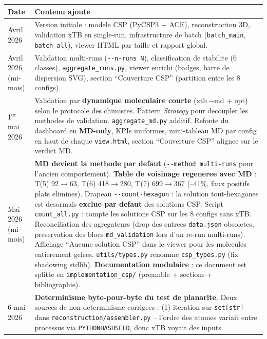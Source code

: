 \begin{center}
\begin{tabular}{lp{11cm}}
  \toprule
  Date & Contenu ajoute \\
  \midrule
  Avril 2026 &
    Version initiale : modele CSP (PyCSP3 + ACE), reconstruction 3D, validation
    xTB en single-run, infrastructure de batch (\texttt{batch\_main}, \texttt{batch\_all}),
    viewer HTML par taille et rapport global. \\
  Avril 2026 (mi-mois) &
    Validation multi-runs (\texttt{-{}-n-runs N}), classification de stabilite
    (6 classes), \texttt{aggregate\_runs.py}, viewer enrichi (badges, barre de
    dispersion SVG), section ``Couverture CSP'' (partition entre les 8 configs). \\
  1\textsuperscript{er} mai 2026 &
    Validation par \textbf{dynamique moleculaire courte} (xtb -{}-md + opt) selon le
    protocole des chimistes. Pattern \emph{Strategy} pour decoupler les methodes de
    validation. \texttt{aggregate\_md.py} additif. Refonte du dashboard en
    \textbf{MD-only}, KPIs uniformes, mini-tableau MD par config en haut de chaque
    \texttt{view.html}, section ``Couverture CSP'' alignee sur le verdict MD. \\
  Mai 2026 (mi-mois) &
    \textbf{MD devient la methode par defaut} (\texttt{-{}-method multi-runs} pour
    l'ancien comportement). \textbf{Table de voisinage regeneree avec MD} :
    T(5) 92$\to$63, T(6) 418$\to$280, T(7) 699$\to$367 (--41\%, faux positifs
    plats elimines). Drapeau \texttt{-{}-count-hexagon} : la solution tout-hexagones
    est desormais \textbf{exclue par defaut} des solutions CSP. Script
    \texttt{count\_all.py} : compte les solutions CSP sur les 8 configs sans xTB.
    Reconciliation des agregateurs (drop des entrees \texttt{data.json} obsoletes,
    preservation des blocs \texttt{md\_validation} lors d'un re-run multi-runs).
    Affichage ``Aucune solution CSP'' dans le viewer pour les molecules entierement
    gelees. \texttt{utils/types.py} renomme \texttt{csp\_types.py} (fix shadowing
    stdlib). \textbf{Documentation modulaire} : ce document est splitte en
    \texttt{implementation\_csp/} (preamble + sections + bibliographie). \\
  6 mai 2026 &
    \textbf{Determinisme byte-pour-byte du test de planarite}. Deux sources de
    non-determinisme corrigees : (1) iteration sur \texttt{set[str]} dans
    \texttt{reconstruction/assembler.py} -- l'ordre des atomes variait entre
    processus via \texttt{PYTHONHASHSEED}, donc xTB voyait des inputs

\end{tabular}
\end{center}
